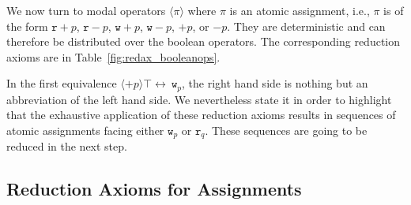 \documentclass{llncs}
\newcommand{\readable}[1]{\mathtt{r}_{#1}}
\newcommand{\writable}[1]{\mathtt{w}_{#1}}
\newcommand{\assgntopR}[1]{{\mathtt r {+} #1}}
\newcommand{\assgnbotR}[1]{{\mathtt r {-} #1}}
\newcommand{\assgntopW}[1]{{\mathtt w {+} #1}}
\newcommand{\assgnbotW}[1]{{\mathtt w {-} #1}}
\newcommand{\assgntopV}[1]{{\mathtt {+} #1}}
\newcommand{\assgnbotV}[1]{{\mathtt {-} #1}}
\newcommand{\ldia}[1]{ \big\langle #1 \big\rangle}
\newcommand{\leqv}{ \leftrightarrow }
\begin{document}
We now turn to modal operators $\ldia \pi$ where $\pi$ is an atomic assignment, i.e., $\pi$ is of the form 
$\assgntopR p $, $\assgnbotR p $,
$\assgntopW p $, $\assgnbotW p $, 
$\assgntopV p $, or $\assgnbotV p $. 
They are deterministic and can therefore be distributed over the boolean operators.
The corresponding reduction axioms are in Table~\ref{fig:redax_booleanops}.

In the first equivalence $\ldia{\assgntopV p} \top \leqv \  \writable p$, 
the right hand side is nothing but an abbreviation of the left hand side. 
We nevertheless state it in order to highlight that the exhaustive application of these reduction axioms 
results in sequences of atomic assignments facing 
either $\writable p$ or $\readable q$. 
These sequences are going to be reduced in the next step. 


\subsection{Reduction Axioms for Assignments}\label{sec:redax_atmpgm} 
\end{document}
